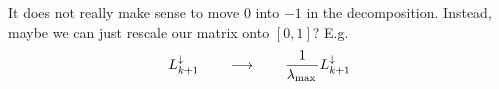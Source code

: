 \documentclass{mynotes}
\begin{document}
\begin{remark}
      It does not really make sense to move \( 0 \) into \( -1 \) in the decomposition. Instead, maybe we can just rescale our matrix onto \( [0 , 1 ]\)? E.g.
      \begin{equation}
            L_{k+1}^{\downarrow} \qquad \longrightarrow \qquad \frac{1}{\lambda_{\max{}}} L_{k+1}^{\downarrow}
      \end{equation}
\end{remark}








\begin{comment}
\chapter{ Simplicial complexes }

A \emph{simplicial complex} \( \mc K \) on the vertices \( \{ v_1, v_2 \ldots v_n \} \) is a collection of simplices \( \sigma \), sets of nodes with the property that all the subsets of $\sigma$ are simplicies of $\mc K$ too.   
We refer to a simplex made out of $k$ nodes \( \sigma = [ v_{i_1}, \ldots v_{i_{k+1}} ] \) as being of order \( k \), and write \( \dim \sigma = k \); the set of all the simplices of order \( k \) in the complex \( \mc K \) is denoted by \( \V k \). Thus, \( \V 0 \) are the vertices of $\mc K$, \( \V 1 \) are edges between pairs of vertices, \( \V 2 \) triangles connecting three vertices, and so on. We let \( m_k = | \V k | \) denote the cardinality of \( \V k\).


\end{comment}
\end{document}

